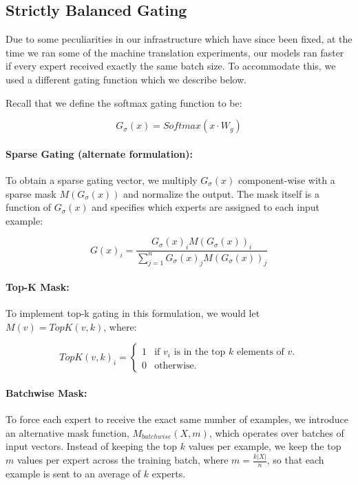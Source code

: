 \documentclass{article}
\begin{document}
\subsection{Strictly Balanced Gating}\label{sec:batchwisemask} 

Due to some peculiarities in our infrastructure which have since been fixed, at the time we ran some of the machine translation experiments, our models ran faster if every expert received exactly the same batch size.  To accommodate this, we used a different gating function which we describe below.  

Recall that we define the softmax gating function to be:

\begin{equation}\label{eq:softmax}
G_\sigma(x) = Softmax(x \cdot W_g)
\end{equation}

\paragraph{Sparse Gating (alternate formulation):} To obtain a sparse gating vector, we multiply $G_\sigma(x)$ component-wise with a sparse mask $M(G_\sigma(x))$ and normalize the output. The mask itself is a function of $G_\sigma(x)$ and specifies which experts are assigned to each input example: 

\begin{equation}\label{eq:g_top_k}
G(x)_i = \frac{G_\sigma(x)_i M(G_\sigma(x))_i}{\sum_{j=1}^{n} G_\sigma(x)_j M(G_\sigma(x))_j }
\end{equation}

\paragraph{Top-K Mask:} To implement top-k gating in this formulation, we would let $M(v) = TopK(v, k)$, where:

\begin{equation}\label{eq:top_k}
TopK(v, k)_i = \begin{cases}
            1 & \text{if $v_i$ is in the top $k$ elements of $v$.} \\
            0 & \text{otherwise.}
        \end{cases}
\end{equation}

\paragraph{Batchwise Mask:} To force each expert to receive the exact same number of examples, we introduce an alternative mask function, $M_{batchwise}(X, m)$, which operates over batches of input vectors.   Instead of keeping the top $k$ values per example, we keep the top $m$ values per expert across the training batch, where $m=\frac{k|X|}{n}$, so that each example is sent to an average of $k$ experts.
\end{document}
